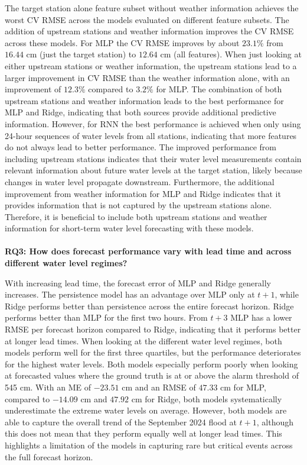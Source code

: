 The target station alone feature subset without weather information achieves the worst \ac{CV} \ac{RMSE} across the models evaluated on different feature subsets. The addition of upstream stations and weather information improves the \ac{CV} \ac{RMSE} across these models. For \ac{MLP} the \ac{CV} \ac{RMSE} improves by about $23.1\%$ from $16.44$ cm (just the target station) to $12.64$ cm (all features). When just looking at either upstream stations or weather information, the upstream stations lead to a larger improvement in \ac{CV} \ac{RMSE} than the weather information alone, with an improvement of $12.3\%$ compared to $3.2\%$ for \ac{MLP}. The combination of both upstream stations and weather information leads to the best performance for \ac{MLP} and Ridge, indicating that both sources provide additional predictive information. However, for \ac{RNN} the best performance is achieved when only using 24-hour sequences of water levels from all stations, indicating that more features do not always lead to better performance. The improved performance from including upstream stations indicates that their water level measurements contain relevant information about future water levels at the target station, likely because changes in water level propagate downstream. Furthermore, the additional improvement from weather information for \ac{MLP} and Ridge indicates that it provides information that is not captured by the upstream stations alone. Therefore, it is beneficial to include both upstream stations and weather information for short-term water level forecasting with these models.
\\ \\
\textbf{\ac{RQ}3: How does forecast performance vary with lead time and across different water level regimes?}

With increasing lead time, the forecast error of \ac{MLP} and Ridge generally increases. The persistence model has an advantage over \ac{MLP} only at $t+1$, while Ridge performs better than persistence across the entire forecast horizon. Ridge performs better than \ac{MLP} for the first two hours. From $t+3$ \ac{MLP} has a lower \ac{RMSE} per forecast horizon compared to Ridge, indicating that it performs better at longer lead times. When looking at the different water level regimes, both models perform well for the first three quartiles, but the performance deteriorates for the highest water levels. Both models especially perform poorly when looking at forecasted values where the ground truth is at or above the alarm threshold of 545 cm. With an \ac{ME} of $-23.51$ cm and an \ac{RMSE} of $47.33$ cm for \ac{MLP}, compared to $-14.09$ cm and $47.92$ cm for Ridge, both models systematically underestimate the extreme water levels on average. However, both models are able to capture the overall trend of the September 2024 flood at $t+1$, although this does not mean that they perform equally well at longer lead times. This highlights a limitation of the models in capturing rare but critical events across the full forecast horizon.
